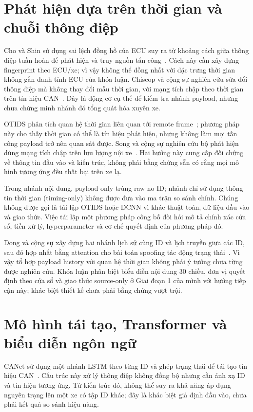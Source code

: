 \documentclass[12pt, a4paper, reqno, oneside]{book}
\begin{document}
\section{Phát hiện dựa trên thời gian và chuỗi thông điệp}
Cho và Shin sử dụng sai lệch đồng hồ của ECU suy ra từ khoảng cách giữa thông điệp tuần hoàn để phát hiện và truy nguồn tấn công~\cite{cho2016fingerprint}. Cách này cần xây dựng fingerprint theo ECU/xe; vì vậy không thể đồng nhất với đặc trưng thời gian không gắn danh tính ECU của khóa luận. Chiscop và cộng sự nghiên cứu sửa đổi thông điệp mà không thay đổi mẫu thời gian, với mạng tích chập theo thời gian trên tín hiệu CAN~\cite{chiscop2021modification}. Đây là động cơ cụ thể để kiểm tra nhánh payload, nhưng chưa chứng minh nhánh đó tổng quát hóa xuyên xe.

OTIDS phân tích quan hệ thời gian liên quan tới remote frame~\cite{lee2017otids}; phương pháp này cho thấy thời gian có thể là tín hiệu phát hiện, nhưng không làm mọi tấn công payload trở nên quan sát được. Song và cộng sự nghiên cứu bộ phát hiện dùng mạng tích chập trên lưu lượng nội xe~\cite{song2020dcnn}. Hai hướng này cung cấp đối chứng về thông tin đầu vào và kiến trúc, không phải bằng chứng sẵn có rằng mọi mô hình tương ứng đều thất bại trên xe lạ.

Trong nhánh nội dung, payload-only trùng raw-no-ID; nhánh chỉ sử dụng thông tin thời gian (timing-only) không được đưa vào ma trận so sánh chính. Chúng không được gọi là tái lập OTIDS hoặc DCNN vì khác thuật toán, dữ liệu đầu vào và giao thức. Việc tái lập một phương pháp công bố đòi hỏi mô tả chính xác cửa sổ, tiền xử lý, hyperparameter và cơ chế quyết định của phương pháp đó.

Dong và cộng sự xây dựng hai nhánh lịch sử cùng ID và lịch truyền giữa các ID, sau đó hợp nhất bằng attention cho bài toán spoofing tác động trạng thái~\cite{dong2026mtff}. Vì vậy tổ hợp payload history với quan hệ thời gian không phải ý tưởng chưa từng được nghiên cứu. Khóa luận phân biệt biểu diễn nội dung 30 chiều, đơn vị quyết định theo cửa sổ và giao thức source-only ở Giai đoạn 1 của mình với hướng tiếp cận này; khác biệt thiết kế chưa phải bằng chứng vượt trội.

\section{Mô hình tái tạo, Transformer và biểu diễn ngôn ngữ}
CANet sử dụng một nhánh LSTM theo từng ID và ghép trạng thái để tái tạo tín hiệu CAN~\cite{hanselmann2020canet}. Cấu trúc này xử lý thông điệp không đồng bộ nhưng cần ánh xạ ID và tín hiệu tương ứng. Từ kiến trúc đó, không thể suy ra khả năng áp dụng nguyên trạng lên một xe có tập ID khác; đây là khác biệt giả định đầu vào, chưa phải kết quả so sánh hiệu năng.
\end{document}
